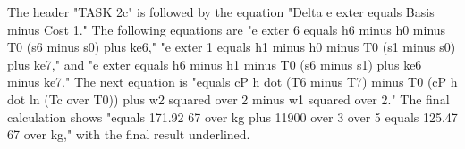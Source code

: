 The header "TASK 2c" is followed by the equation "Delta e exter equals Basis minus Cost 1." The following equations are "e exter 6 equals h6 minus h0 minus T0 (s6 minus s0) plus ke6," "e exter 1 equals h1 minus h0 minus T0 (s1 minus s0) plus ke7," and "e exter equals h6 minus h1 minus T0 (s6 minus s1) plus ke6 minus ke7." The next equation is "equals cP h dot (T6 minus T7) minus T0 (cP h dot ln (Tc over T0)) plus w2 squared over 2 minus w1 squared over 2." The final calculation shows "equals 171.92 67 over kg plus 11900 over 3 over 5 equals 125.47 67 over kg," with the final result underlined.